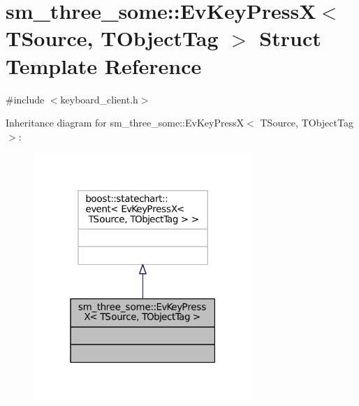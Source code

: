 \hypertarget{structsm__three__some_1_1EvKeyPressX}{}\section{sm\+\_\+three\+\_\+some\+:\+:Ev\+Key\+PressX$<$ T\+Source, T\+Object\+Tag $>$ Struct Template Reference}
\label{structsm__three__some_1_1EvKeyPressX}


{\ttfamily \#include $<$keyboard\+\_\+client.\+h$>$}



Inheritance diagram for sm\+\_\+three\+\_\+some\+:\+:Ev\+Key\+PressX$<$ T\+Source, T\+Object\+Tag $>$\+:
\nopagebreak
\begin{figure}[H]
\begin{center}
\leavevmode
\includegraphics[width=235pt]{structsm__three__some_1_1EvKeyPressX__inherit__graph}
\end{center}
\end{figure}


